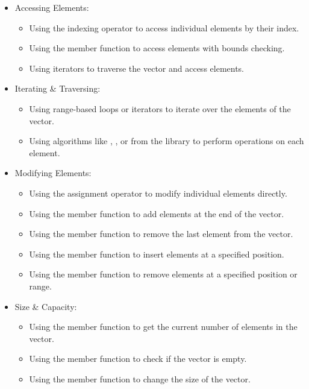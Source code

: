 \begin{itemize}
    \item Accessing Elements:
    \begin{itemize}
        \item Using the indexing operator \function{[]} to access individual elements by their index.
        \item Using the  member function to access elements with bounds checking.
        \item Using iterators to traverse the vector and access elements.
    \end{itemize}
    \item Iterating \& Traversing:
    \begin{itemize}
        \item Using range-based  loops or iterators to iterate over the elements of the vector.
        \item Using algorithms like , , or  from the  library to perform operations on each element.
    \end{itemize}
    \item Modifying Elements:
    \begin{itemize}
        \item Using the assignment operator \function{=} to modify individual elements directly.
        \item Using the  member function to add elements at the end of the vector.
        \item Using the  member function to remove the last element from the vector.
        \item Using the  member function to insert elements at a specified position.
        \item Using the  member function to remove elements at a specified position or range.
    \end{itemize}
    \item Size \& Capacity:
    \begin{itemize}
        \item Using the  member function to get the current number of elements in the vector.
        \item Using the  member function to check if the vector is empty.
        \item Using the  member function to change the size of the vector.

\end{itemize}
\end{itemize}
